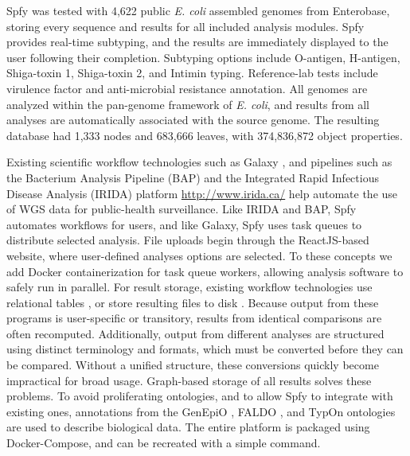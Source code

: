 \documentclass[a4,center,fleqn]{NAR}
\begin{document}
Spfy was tested with 4,622 public \textit{E. coli} assembled genomes from Enterobase, storing every sequence and results for all included analysis modules.
Spfy provides real-time subtyping, and the results are immediately displayed to the user following their completion.
Subtyping options include O-antigen, H-antigen, Shiga-toxin 1, Shiga-toxin 2, and Intimin typing. Reference-lab tests include virulence factor and anti-microbial resistance annotation. All genomes are analyzed within the pan-genome framework of \textit{E. coli}, and results from all analyses are automatically associated with the source genome.
The resulting database had 1,333 nodes and 683,666 leaves, with 374,836,872 object properties. \par

Existing scientific workflow technologies such as Galaxy \cite{goecks2010galaxy}, and pipelines such as the Bacterium Analysis Pipeline (BAP) \cite{thomsen2016bacterial} and the Integrated Rapid Infectious Disease Analysis (IRIDA) platform \url{http://www.irida.ca/} help automate the use of WGS data for public-health surveillance.
Like IRIDA and BAP, Spfy automates workflows for users, and like Galaxy, Spfy uses task queues to distribute selected analysis. File uploads begin through the ReactJS-based website, where user-defined analyses options are selected. To these concepts we add Docker containerization for task queue workers, allowing analysis software to safely run in parallel.
For result storage, existing workflow technologies use relational tables \cite{goecks2010galaxy}, or store resulting files to disk \cite{thomsen2016bacterial}.
Because output from these programs is user-specific or transitory, results from identical comparisons are often recomputed. Additionally, output from different analyses are structured using distinct terminology and formats, which must be converted before they can be compared. Without a unified structure, these conversions quickly become impractical for broad usage. Graph-based storage of all results solves these problems.
To avoid proliferating ontologies, and to allow Spfy to integrate with existing ones, annotations from the GenEpiO \cite{griffiths2017context}, FALDO \cite{bolleman2016faldo}, and TypOn \cite{vaz2014typon} ontologies are used to describe biological data.
The entire platform is packaged using Docker-Compose, and can be recreated with a simple command. \par
\end{document}
